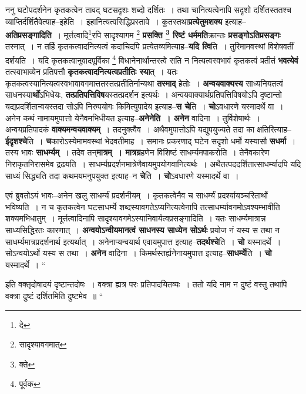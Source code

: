 \documentclass[article,12pt,a4paper]{memoir}
\begin{document}
	  \pstart ननु घटोपदर्शनेन कृतकत्वेन तावद् घटसदृशः शब्दो दर्शितः । तथा चानित्यत्वेनापि सदृशो दर्शितस्ततश्च व्याप्तिर्दर्शितैवेत्याह--इहेति । इहानित्यत्वसिद्धिप्रस्तावे । कुतस्तथा\textbf{प्रत्येतुमशक्य} इत्याह--\textbf{अतिप्रसङ्गादिति} । मूर्त्तत्वादि\footnote{दे}रपि सादृश्यागम \footnote{सादृश्यावगमात्} \textbf{प्रसक्ति \footnote{क्ते} रिष्टं धर्ममति}क्रान्तः \textbf{प्रसङ्गोऽतिप्रसङ्गः} तस्मात् । न तर्हि कृतकत्वादनित्यत्वं कदाचिदपि प्रत्येतव्यमित्याह--\textbf{यदि त्वि}ति । तुरिमामवस्थां विशेषवतीं दर्शयति । यदि कृतकत्वानुवादपूर्विका \footnote{पूर्वक} विधानेनार्थान्तरत्वे सति न नित्यत्वस्वभावं कृतकत्वं प्रतीतं \textbf{भवत्येवं} तत्स्वाभाव्येन प्रतिपत्तौ \textbf{कृतकत्वादनित्यत्वप्रतीतिः स्या}त् । यतः कृतकत्वस्यानित्यत्वस्वभावावगमात्ततस्तत्प्रतीतिर्नान्यथा \textbf{तस्माद्} हेतोः । \textbf{अन्वयवाक्यस्य} साध्यनियतत्वं साधनस्या\textbf{र्थो}ऽभिधेयः, \textbf{तत्प्रतिपत्तिविष}यस्तत्प्रदर्शन इत्यर्थः । अन्वयवाक्यार्थप्रतिपत्तिविषयोऽपि दृष्टान्तो यद्यप्रदर्शितान्वयस्तदा सोऽपि निरुपयोगः किमित्युपादेय इत्याह--\textbf{स चे}ति । \textbf{चो}ऽवधारणे यस्मादर्थे वा । अनेन कथं नामायमुपात्तो येनैवमभिधीयत इत्याह--\textbf{अनेनेति । अनेन} वादिना । तुर्विशेषार्थः । अन्वयप्रतिपादकं \textbf{वाक्यमन्वयवाक्यम्} । तदनुक्त्वैव । अथैवमुपात्तोऽपि यद्युपयुज्यते तदा का क्षतिरित्याह--\textbf{ईदृशश्चे}ति । \textbf{च}कारोऽस्येमामवस्थां भेदवतीमाह । समानः प्रकरणाद् घटेन सदृशो धर्मो यस्यासौ \textbf{सधर्मा} । तस्य भावः \textbf{साधर्म्यम्} । तदेव तन्\textbf{मात्रम् । मात्रग्र}हणेन विशिष्टं साधर्म्यमपाकरोति । तेनैवकारेण निराकृतनिरासमेव द्रढयति । साधर्म्यप्रदर्शनमात्रेणैवायमुपयोगवानित्यर्थः । अथैतत्पददर्शितात्साधर्म्यादपि यदि साध्यं सिद्ध्यति तदा कथमयमनुपयुक्त इत्याह--न \textbf{चे}ति । \textbf{चो}ऽवधारणे यस्मादर्थे वा ।
	\pend
      

	  \pstart एवं ब्रुवतोऽयं भावः--अनेन खलु साधर्म्यं प्रदर्शनीयम् । कृतकत्वेनैव च साधर्म्यं प्रदर्श्यायञ्चरितार्थो भविष्यति । न च कृतकत्वेन घटसाधर्म्ये शब्दस्यावगतेऽप्यनित्यत्वेनापि तत्साधर्म्यावगमोऽवश्यम्भावीति शक्यमभिधातुम् । मूर्त्तत्वादिनापि सादृश्यावगमेऽस्यानिवार्यत्वप्रसङ्गादिति । यतः साधर्म्यमात्रान्न साध्यसिद्धिरतः कारणात् । \textbf{अन्वयोऽन्वीयमानत्वं साधनस्य साध्येन सोऽर्थः} प्रयोज \leavevmode{} नं यस्य स तथा न साधर्म्यमात्रप्रदर्शनार्थ इत्यर्थात् । अनेनाप्यन्वयार्थ एवायमुपात्त इत्याह--\textbf{तदर्थश्चे}ति । \textbf{चो} यस्मादर्थे । सोऽन्वयोऽर्थो यस्य स तथा । \textbf{अनेन} वादिना । किमर्थस्तर्ह्यनेनायमुपात्त इत्याह--\textbf{साधर्म्ये}ति । \textbf{चो} यस्मादर्थे ।  \leavevmode{} “
	  
	इति वक्तृदोषादयं दृष्टान्तदोषः । वक्त्रा ह्यत्र परः प्रतिपादयितव्यः । ततो यदि नाम न दुष्टं वस्तु तथापि वक्त्रा दुष्टं दर्शितमिति दुष्टमेव ॥ “
	  
\end{document}
